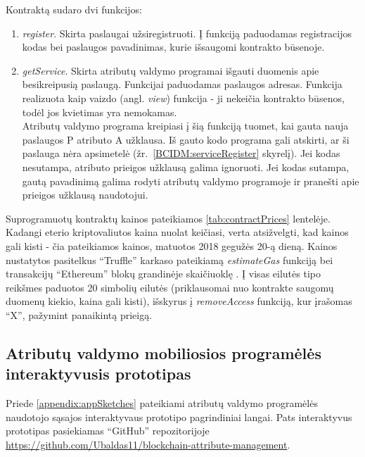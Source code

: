 Kontraktą sudaro dvi funkcijos:

\begin{enumerate}
    \item \textit{register}. Skirta paslaugai užsiregistruoti. Į funkciją paduodamas registracijos kodas bei paslaugos pavadinimas, kurie išsaugomi kontrakto būsenoje.
    \item \textit{getService}. Skirta atributų valdymo programai išgauti duomenis apie besikreipusią paslaugą. Funkcijai paduodamas paslaugos adresas.
    Funkcija realizuota kaip vaizdo (angl. \textit{view}) funkcija - ji nekeičia kontrakto būsenos, todėl jos kvietimas yra nemokamas. \\ 
    Atributų valdymo programa kreipiasi į šią funkciją tuomet, kai gauta nauja paslaugos P atributo A užklausa.
    Iš gauto kodo programa gali atskirti, ar ši paslauga nėra apsimetelė
    (žr.\hypertarget{BCIDM:serviceRegister}{~\ref{BCIDM:serviceRegister} skyrelį}). Jei kodas nesutampa, atributo prieigos užklausą galima ignoruoti. Jei kodas sutampa,
    gautą pavadinimą galima rodyti atributų valdymo programoje ir pranešti apie prieigos užklausą naudotojui.
\end{enumerate}

Suprogramuotų kontraktų kainos pateikiamos \hypertarget{tab:contractPrices}{\ref{tab:contractPrices}} lentelėje. Kadangi eterio kriptovaliutos kaina
nuolat keičiasi, verta atsižvelgti, kad kainos gali kisti - čia pateikiamos kainos, matuotos 2018 gegužės 20-ą dieną. Kainos nustatytos
pasitelkus \enquote{Truffle} karkaso pateikiamą \textit{estimateGas} funkciją bei transakcijų \enquote{Ethereum} blokų grandinėje skaičiuoklę \cite{EthereumGasStation}.
Į visas eilutės tipo reikšmes paduotos 20 simbolių eilutės (priklausomai nuo kontrakte saugomų duomenų kiekio, kaina gali kisti), išskyrus
į \textit{removeAccess} funkciją, kur įrašomas \enquote{X}, pažymint panaikintą prieigą.



\subsection{Atributų valdymo mobiliosios programėlės interaktyvusis prototipas}

Priede \hypertarget{appendix:appSketches}{\ref{appendix:appSketches}} pateikiami atributų valdymo programėlės naudotojo sąsajos interaktyvaus prototipo pagrindiniai
langai. Pats interaktyvus prototipas pasiekiamas \enquote{GitHub} repozitorijoje
\url{https://github.com/Ubaldas11/blockchain-attribute-management}.

